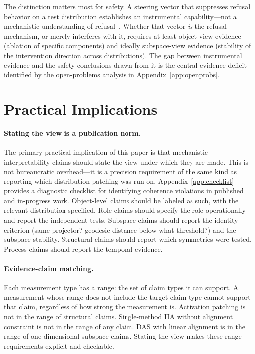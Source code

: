 \documentclass[11pt]{article}
\theoremstyle{remark}
\begin{document}
The distinction matters most for safety.  A steering vector that
suppresses refusal behavior on a test distribution establishes an
instrumental capability---not a mechanistic understanding of
refusal~\citep{turner2024}.  Whether that vector \emph{is} the refusal
mechanism, or merely interferes with it, requires at least object-view
evidence (ablation of specific components) and ideally subspace-view
evidence (stability of the intervention direction across distributions).
The gap between instrumental evidence and the safety conclusions drawn
from it is the central evidence deficit identified by the open-problems
analysis in Appendix~\ref{app:openprobs}.


\section{Practical Implications}\label{sec:implications}

\paragraph{Stating the view is a publication norm.}
The primary practical implication of this paper is that mechanistic
interpretability claims should state the view under which they are made.
This is not bureaucratic overhead---it is a precision requirement of
the same kind as reporting which distribution patching was run on.
Appendix~\ref{app:checklist} provides a diagnostic checklist for
identifying coherence violations in published and in-progress work.
Object-level claims should be labeled as such, with the relevant
distribution specified.  Role claims should specify the role operationally
and report the independent tests.  Subspace claims should report the
identity criterion (same projector? geodesic distance below what
threshold?) and the subspace stability.  Structural claims should report
which symmetries were tested.  Process claims should report the
temporal evidence.

\paragraph{Evidence-claim matching.}
Each measurement type has a range: the set of claim types it can support.
A measurement whose range does not include the target claim type cannot
support that claim, regardless of how strong the measurement is.
Activation patching is not in the range of structural claims.
Single-method IIA without alignment constraint is not in the range of
any claim.  DAS with linear alignment is in the range of
one-dimensional subspace claims.  Stating the view makes these
range requirements explicit and checkable.
\end{document}
